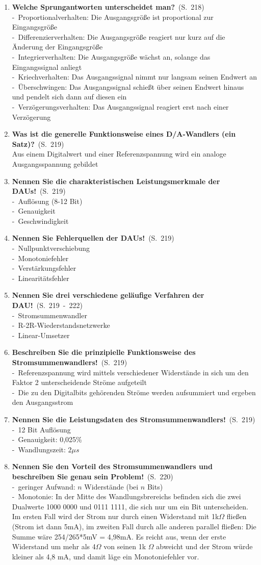\documentclass[a4paper,12pt]{article}
\newcommand{\question}[3]{\pagebreak[3]\item {\textbf{#1?}}\ (S.\ #2)#3}
\newcommand{\statement}[3]{\pagebreak[3]\item {\textbf{#1!}}\ (S.\ #2)#3}
\newcommand{\catchword}[1]{\\-\ #1}
\newcommand{\normaltext}[1]{\\#1}
\newcommand{\page}[1]{#1}
\newcommand{\pages}[2]{#1\ -\ #2}
\begin{document}
\begin{enumerate}
  \question{Welche Sprungantworten unterscheidet man}{\page{218}}
  {
    \catchword{Proportionalverhalten: Die Ausgangsgröße ist proportional zur Eingangsgröße}
    \catchword{Differenzierverhalten: Die Ausgangsgröße reagiert nur kurz auf die Änderung
               der Eingangsgröße}
    \catchword{Integrierverhalten: Die Ausgangsgröße wächst an, solange das Eingangssignal
               anliegt}
    \catchword{Kriechverhalten: Das Ausgangssignal nimmt nur langsam seinen Endwert an}
    \catchword{Überschwingen: Das Ausgangssignal schießt über seinen Endwert hinaus und
               pendelt sich dann auf diesen ein}
    \catchword{Verzögerungsverhalten: Das Ausgangssignal reagiert erst nach einer Verzögerung}
  }

  \question{Was ist die generelle Funktionsweise eines D/A-Wandlers (ein Satz)}{\page{219}}
  {
    \normaltext{Aus einem Digitalwert und einer Referenzspannung wird ein analoge Ausgangsspannung gebildet}
  }

  \statement{Nennen Sie die charakteristischen Leistungsmerkmale der DAUs}{\page{219}}
  {
    \catchword{Auflösung (8-12 Bit)}
    \catchword{Genauigkeit}
    \catchword{Geschwindigkeit}
  }

  \statement{Nennen Sie Fehlerquellen der DAUs}{\page{219}}
  {
    \catchword{Nullpunktverschiebung}
    \catchword{Monotoniefehler}
    \catchword{Verstärkungsfehler}
    \catchword{Linearitätsfehler}
  }

  \statement{Nennen Sie drei verschiedene geläufige Verfahren der DAU}{\pages{219}{222}}
  {
    \catchword{Stromsummenwandler}
    \catchword{R-2R-Wiederstandsnetzwerke}
    \catchword{Linear-Umsetzer}
  }

  \statement{Beschreiben Sie die prinzipielle Funktionsweise des Stromsummenwandlers}{\page{219}}
  {
    \catchword{Referenzspannung wird mittels verschiedener Widerstände in sich um den Faktor 2
               unterscheidende Ströme aufgeteilt}
    \catchword{Die zu den Digitalbits gehörenden Ströme werden aufsummiert und ergeben den Ausgangsstrom}
  }

  \statement{Nennen Sie die Leistungsdaten des Stromsummenwandlers}{\page{219}}
  {
    \catchword{12 Bit Auflösung}
    \catchword{Genauigkeit: 0,025\%}
    \catchword{Wandlungszeit: 2$\mu s$}
  }

  \statement{Nennen Sie den Vorteil des Stromsummenwandlers und beschreiben Sie
             genau sein Problem}{\page{220}}
  {
    \catchword{geringer Aufwand: $n$ Widerstände (bei $n$ Bits)}
    \catchword{Monotonie: In der Mitte des Wandlungsbrereichs befinden sich die zwei Dualwerte 1000 0000
               und 0111 1111, die sich nur um ein Bit unterscheiden. Im ersten Fall wird der Strom nur
               durch einen Widerstand mit 1k$\Omega$ fließen (Strom ist dann 5mA), im zweiten Fall
               durch alle anderen parallel fließen: Die Summe wäre 254/265*5mV = 4,98mA. Es reicht aus,
               wenn der erste Widerstand um mehr als 4$\Omega$ von seinen 1k $\Omega$ abweicht und der
               Strom würde kleiner als 4,8 mA, und damit läge ein Monotoniefehler vor.}
  }


\end{enumerate}
\end{document}

